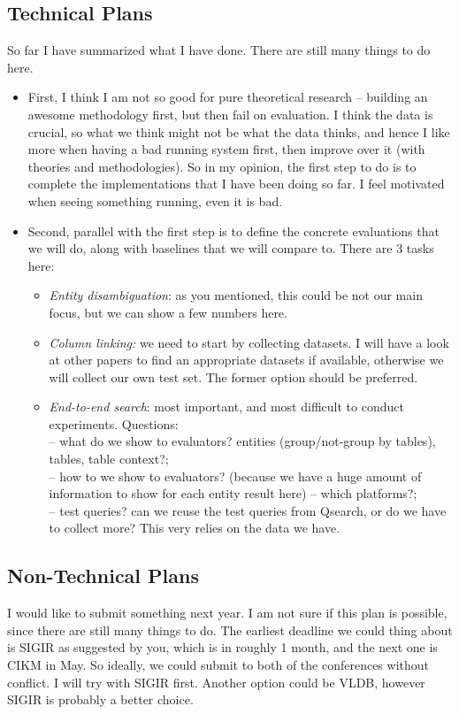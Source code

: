 \documentclass{article}
\begin{document}
\subsection{Technical Plans}
So far I have summarized what I have done. There are still many things to do here.
\begin{itemize}
\item First, I think I am not so good for pure theoretical research -- building an awesome methodology first, but then fail on evaluation. I think the data is crucial, so what we think might not be what the data thinks, and hence I like more when having a bad running system first, then improve over it (with theories and methodologies). So in my opinion, the first step to do is to complete the implementations that I have been doing so far. I feel motivated when seeing something running, even it is bad.

\item Second, parallel with the first step is to define the concrete evaluations that we will do, along with baselines that we will compare to. There are 3 tasks here:
\begin{itemize}
\item \textit{Entity disambiguation}:  as you mentioned, this could be not our main focus, but we can show a few numbers here.
\item \textit{Column linking:} we need to start by collecting datasets. I will have a look at other papers to find an appropriate datasets if available, otherwise we will collect our own test set. The former option should be preferred.
\item \textit{End-to-end search}: most important, and most difficult to conduct experiments. Questions: 
\\ -- what do we show to evaluators? entities (group/not-group by tables), tables, table context?;\\ -- how to we show to evaluators? (because we have a huge amount of information to show for each entity result here) -- which platforms?;\\ -- test queries? can we reuse the test queries from Qsearch, or do we have to collect more? This very relies on the data we have. 
\end{itemize}

\end{itemize}
\subsection{Non-Technical Plans}
I would like to submit something next year. I am not sure if this plan is possible, since there are still many things to do. The earliest deadline we could thing about is SIGIR as suggested by you, which is in roughly 1 month, and the next one is CIKM in May. So ideally, we could submit to both of the conferences without conflict. I will try with SIGIR first. Another option could be VLDB, however SIGIR is probably a better choice.
\end{document}
